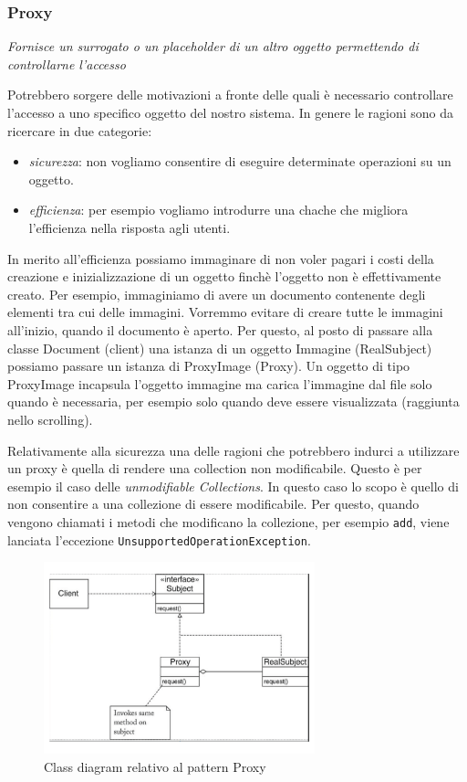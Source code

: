 \documentclass{article}
\begin{document}
\subsubsection{Proxy}
\begin{framed}
\emph{Fornisce un surrogato o un placeholder di un altro oggetto permettendo di controllarne l'accesso}
\end{framed}
Potrebbero sorgere delle motivazioni a fronte delle quali \`e necessario controllare l'accesso a uno specifico oggetto del nostro sistema. In genere le ragioni sono da ricercare in due categorie:
\begin{itemize}
\item \emph{sicurezza}: non vogliamo consentire di eseguire determinate operazioni su un oggetto.
\item \emph{efficienza}: per esempio vogliamo introdurre una chache che migliora l'efficienza nella risposta agli utenti.
\end{itemize}

In merito all'efficienza possiamo immaginare di non voler pagari i costi della creazione e inizializzazione di un oggetto finch\`e l'oggetto non \`e effettivamente creato. Per esempio, immaginiamo di avere un documento contenente degli elementi tra cui delle immagini. Vorremmo evitare di creare tutte le immagini all'inizio, quando il documento \`e aperto. Per questo, al posto di passare alla classe Document (client) una istanza di un oggetto Immagine (RealSubject) possiamo passare un istanza di ProxyImage (Proxy). Un oggetto di tipo ProxyImage incapsula l'oggetto immagine ma carica l'immagine dal file solo quando \`e necessaria, per esempio solo quando deve essere visualizzata (raggiunta nello scrolling).


Relativamente alla sicurezza una delle ragioni che potrebbero indurci a utilizzare un proxy \`e quella di rendere una collection non modificabile. Questo \`e per esempio il caso delle \emph{unmodifiable Collections}. In questo caso lo scopo \`e quello di non consentire a una collezione di essere modificabile. Per questo, quando vengono chiamati i metodi che modificano la collezione, per esempio  \texttt{add}, viene lanciata l'eccezione \texttt{UnsupportedOperationException}.


\begin{figure}
\centering
\includegraphics[width=0.7\textwidth]{Img/Proxy.pdf}
\caption{Class diagram relativo al pattern Proxy}
\label{Fig:ProxyAdapterConcepts}
\end{figure}
\end{document}
